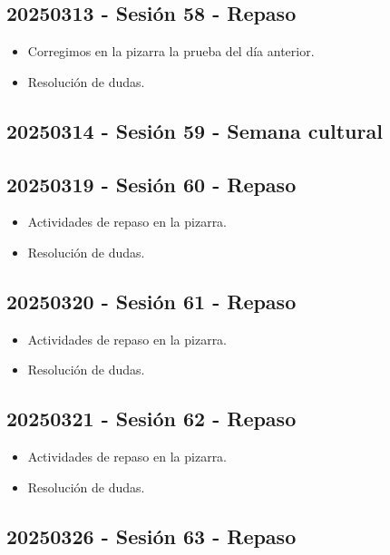 \documentclass[a4paper,12pt]{article}
\begin{document}
\subsection{20250313 - Sesión 58 - Repaso}

\begin{itemize}
    \item Corregimos en la pizarra la prueba del día anterior.
    \item Resolución de dudas.
\end{itemize}

\subsection{20250314 - Sesión 59 - Semana cultural}

\subsection{20250319 - Sesión 60 - Repaso}

\begin{itemize}
    \item Actividades de repaso en la pizarra.
    \item Resolución de dudas.
\end{itemize}

\subsection{20250320 - Sesión 61 - Repaso}

\begin{itemize}
    \item Actividades de repaso en la pizarra.
    \item Resolución de dudas.
\end{itemize}

\subsection{20250321 - Sesión 62 - Repaso}

\begin{itemize}
    \item Actividades de repaso en la pizarra.
    \item Resolución de dudas.
\end{itemize}

\subsection{20250326 - Sesión 63 - Repaso}
\end{document}
